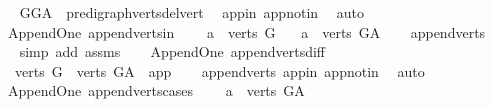 \begin{isabellebody}
\ \ %
\endisadelimproof
%
\isatagproof
{}\isamarkupfalse%
\ GG{\isacharunderscore}{\kern0pt}A\ \ pre{\isacharunderscore}{\kern0pt}digraph{\isachardot}{\kern0pt}verts{\isacharunderscore}{\kern0pt}del{\isacharunderscore}{\kern0pt}vert\ \isamarkupfalse%
\ app{\isacharunderscore}{\kern0pt}in\ app{\isacharunderscore}{\kern0pt}notin\ \isamarkupfalse%
\ auto%
\endisatagproof
{\isafoldproof}%
%
\isadelimproof
\isanewline
%
\endisadelimproof
\isanewline
{}\isamarkupfalse%
\ {\isacharparenleft}{\kern0pt}\ Append{\isacharunderscore}{\kern0pt}One{\isacharparenright}{\kern0pt}\ append{\isacharunderscore}{\kern0pt}verts{\isacharunderscore}{\kern0pt}in{\isacharcolon}{\kern0pt}\ \isanewline
\ \ \ {\isachardoublequoteopen}a\ {\isasymin}\ verts\ G{\isachardoublequoteclose}\isanewline
\ \ \ {\isachardoublequoteopen}a\ {\isasymin}\ verts\ G{\isacharunderscore}{\kern0pt}A{\isachardoublequoteclose}\isanewline
%
\isadelimproof
\ \ %
\endisadelimproof
%
\isatagproof
{}\isamarkupfalse%
\ append{\isacharunderscore}{\kern0pt}verts\isanewline
\ \ \isamarkupfalse%
\ {\isacharparenleft}{\kern0pt}simp\ add{\isacharcolon}{\kern0pt}\ assms{\isacharparenright}{\kern0pt}%
\endisatagproof
{\isafoldproof}%
%
\isadelimproof
\ \isanewline
%
\endisadelimproof
\isanewline
{}\isamarkupfalse%
\ {\isacharparenleft}{\kern0pt}\ Append{\isacharunderscore}{\kern0pt}One{\isacharparenright}{\kern0pt}\ append{\isacharunderscore}{\kern0pt}verts{\isacharunderscore}{\kern0pt}diff{\isacharcolon}{\kern0pt}\ \isanewline
\ \ \ {\isachardoublequoteopen}verts\ G\ {\isacharequal}{\kern0pt}\ verts\ G{\isacharunderscore}{\kern0pt}A\ {\isacharminus}{\kern0pt}\ {\isacharbraceleft}{\kern0pt}app{\isacharbraceright}{\kern0pt}{\isachardoublequoteclose}\isanewline
%
\isadelimproof
\ \ %
\endisadelimproof
%
\isatagproof
{}\isamarkupfalse%
\ append{\isacharunderscore}{\kern0pt}verts\ app{\isacharunderscore}{\kern0pt}in\ app{\isacharunderscore}{\kern0pt}notin\ \isamarkupfalse%
\ auto%
\endisatagproof
{\isafoldproof}%
%
\isadelimproof
\isanewline
%
\endisadelimproof
\isanewline
{}\isamarkupfalse%
\ {\isacharparenleft}{\kern0pt}\ Append{\isacharunderscore}{\kern0pt}One{\isacharparenright}{\kern0pt}\ append{\isacharunderscore}{\kern0pt}verts{\isacharunderscore}{\kern0pt}cases{\isacharcolon}{\kern0pt}\ \isanewline
\ \ \ {\isachardoublequoteopen}a\ {\isasymin}\ verts\ G{\isacharunderscore}{\kern0pt}A{\isachardoublequoteclose}\isanewline

\end{isabellebody}
